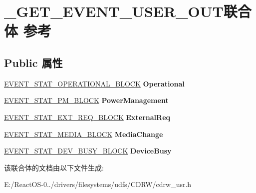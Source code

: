 \hypertarget{union___g_e_t___e_v_e_n_t___u_s_e_r___o_u_t}{}\section{\+\_\+\+G\+E\+T\+\_\+\+E\+V\+E\+N\+T\+\_\+\+U\+S\+E\+R\+\_\+\+O\+U\+T联合体 参考}
\label{union___g_e_t___e_v_e_n_t___u_s_e_r___o_u_t}
\subsection*{Public 属性}
\begin{DoxyCompactItemize}
\item 
\mbox{\label{union___g_e_t___e_v_e_n_t___u_s_e_r___o_u_t_af54cd522d9328ccbaa8ecada6c8868dd}} 
\hyperlink{struct___e_v_e_n_t___s_t_a_t___o_p_e_r_a_t_i_o_n_a_l___b_l_o_c_k}{E\+V\+E\+N\+T\+\_\+\+S\+T\+A\+T\+\_\+\+O\+P\+E\+R\+A\+T\+I\+O\+N\+A\+L\+\_\+\+B\+L\+O\+CK} {\bfseries Operational}
\item 
\mbox{\label{union___g_e_t___e_v_e_n_t___u_s_e_r___o_u_t_ad4441b6360e3013a450313d97bb58659}} 
\hyperlink{struct___e_v_e_n_t___s_t_a_t___p_m___b_l_o_c_k}{E\+V\+E\+N\+T\+\_\+\+S\+T\+A\+T\+\_\+\+P\+M\+\_\+\+B\+L\+O\+CK} {\bfseries Power\+Management}
\item 
\mbox{\label{union___g_e_t___e_v_e_n_t___u_s_e_r___o_u_t_a98883be386ce927855073f7d8f4a9ca1}} 
\hyperlink{struct___e_v_e_n_t___s_t_a_t___e_x_t___r_e_q___b_l_o_c_k}{E\+V\+E\+N\+T\+\_\+\+S\+T\+A\+T\+\_\+\+E\+X\+T\+\_\+\+R\+E\+Q\+\_\+\+B\+L\+O\+CK} {\bfseries External\+Req}
\item 
\mbox{\label{union___g_e_t___e_v_e_n_t___u_s_e_r___o_u_t_acb3bcf25db3e78c6c46b2d67e7c08dba}} 
\hyperlink{struct___e_v_e_n_t___s_t_a_t___m_e_d_i_a___b_l_o_c_k}{E\+V\+E\+N\+T\+\_\+\+S\+T\+A\+T\+\_\+\+M\+E\+D\+I\+A\+\_\+\+B\+L\+O\+CK} {\bfseries Media\+Change}
\item 
\mbox{\label{union___g_e_t___e_v_e_n_t___u_s_e_r___o_u_t_a37566ffa489a1e035fa39ce619c0d145}} 
\hyperlink{struct___e_v_e_n_t___s_t_a_t___d_e_v___b_u_s_y___b_l_o_c_k}{E\+V\+E\+N\+T\+\_\+\+S\+T\+A\+T\+\_\+\+D\+E\+V\+\_\+\+B\+U\+S\+Y\+\_\+\+B\+L\+O\+CK} {\bfseries Device\+Busy}
\end{DoxyCompactItemize}


该联合体的文档由以下文件生成\+:\begin{DoxyCompactItemize}
\item 
E\+:/\+React\+O\+S-\/0../drivers/filesystems/udfs/\+C\+D\+R\+W/cdrw\+\_\+usr.\+h\end{DoxyCompactItemize}
